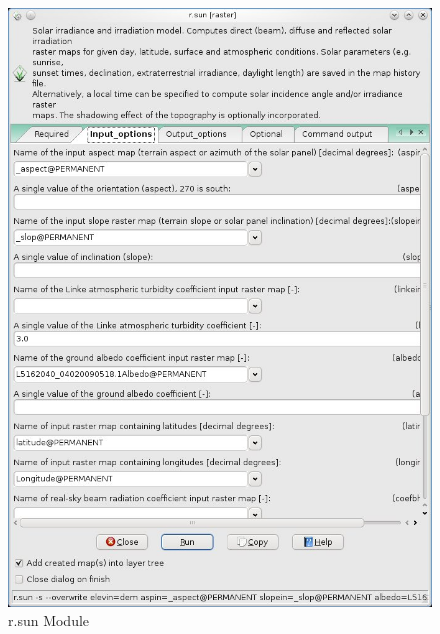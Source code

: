\begin{figure}[htbp]
   \centering
   \includegraphics[scale=0.4]{gipe023.png}
   \caption{r.sun Module}
   \label{fig:gipe023}
\end{figure}

